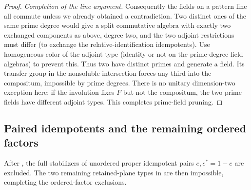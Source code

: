 \begin{proof}
\textit{Completion of the line argument.} Consequently the fields on a pattern line all commute unless we already obtained a contradiction. Two distinct ones of the same prime degree would give a split commutative algebra with exactly two exchanged components as above, degree two, and the two adjoint restrictions must differ (to exchange the relative-identification idempotents). Use homogeneous color of the adjoint type (identity or not on the prime-degree field algebras) to prevent this. Thus two have distinct primes and generate a field. Its transfer group in the nonsoluble intersection forces any third into the compositum, impossible by prime degrees. There is no unitary dimension-two exception here: if the involution fixes \(F\) but not the compositum, the two prime fields have different adjoint types. This completes prime-field pruning.
\end{proof}

\subsection{Paired idempotents and the remaining ordered factors}

\begin{proposition}\label{c:remaining-factors}
After , the full stabilizers of unordered proper idempotent pairs \(e,e^*=1-e\) are excluded. The two remaining retained-plane types in  are then impossible, completing the ordered-factor exclusions.
\end{proposition}

